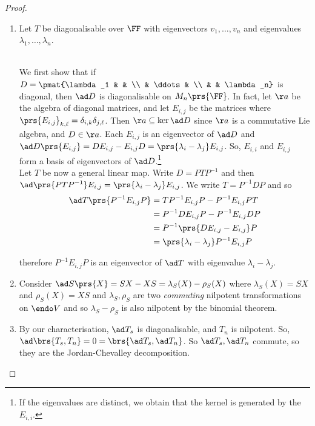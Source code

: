 \documentclass[10pt,a4paper,twoside,openany,hidelinks]{book}
\begin{document}
\begin{proof}
\begin{enumerate}
\item
Let $T$ be diagonalisable over $\FF$ with eigenvectors $v_1, \ldots, v_n$ and eigenvalues $\lambda_1, \ldots, \lambda_n$.
\begin{comment}
To show that it is enough to establish that $\ad D$ is diagonalisable for $D$ diagonal, write $P T P^{-1} = D$ for some $P$.
If $\ad D$ is diagonalisable, so is $\ad \prs{PTP^{-1}}$. But, $\ad\prs{PTP^{-1}}$ is conjugate to $\ad T$ and in fact, $\ad\prs{PTP^{-1}} = J_P\ad\prs{T}J_P^{-1}$ \emph{where we view $P$ as a linear transformation from $\endo V$ to $\endo V$} via $A \mapsto PAP^{-1} \eqqcolon J_P$.
\end{comment}
\\
We first show that if $D = \pmat{\lambda_1 & & \\ & \ddots & \\ & & \lambda_n}$ is diagonal, then $\ad D$ is diagonalisable on $M_n\prs{\FF}$.
In fact, let $\aa$ be the algebra of diagonal matrices, and let $E_{i,j}$ be the matrices where $\prs{E_{i,j}}_{k,\ell} = \delta_{i,k}\delta_{j,\ell}$.
Then $\aa \subseteq \ker \ad D$ since $\aa$ is a commutative Lie algebra, and $D \in \aa$. Each $E_{i,j}$ is an eigenvector of $\ad D$ and $\ad D\prs{E_{i,j}} = DE_{i,j} - E_{i,j}D =  \prs{\lambda_i - \lambda_j}E_{i,j}$.
So, $E_{i,i}$ and $E_{i,j}$ form a basis of eigenvectors of $\ad D$.\footnote{If the eigenvalues are distinct, we obtain that the kernel is generated by the $E_{i,i}$.}\\
Let $T$ be now a general linear map.
Write $D = PTP^{-1}$ and then $\ad \prs{PTP^{-1}} E_{i,j} = \prs{\lambda_i - \lambda_j}E_{i,j}$. We write $T = P^{-1}DP$ and so 
\begin{align*}
\ad T \prs{P^{-1}E_{i,j}P} &= T P^{-1}E_{i,j}P - P^{-1}E_{i,j}PT \\&= P^{-1}DE_{i,j} P - P^{-1} E_{i,j} D P \\&= P^{-1} \prs{DE_{i,j} - E_{i,j}}P \\&= \prs{\lambda_i - \lambda_j} P^{-1} E_{i,j}P
\end{align*}

therefore $P^{-1} E_{i,j} P$ is an eigenvector of $\ad T$ with eigenvalue $\lambda_i - \lambda_j$.
\item Consider $\ad S \prs{X} = SX - XS = \lambda_S(X) - \rho_S(X)$ where $\lambda_S(X) = SX$ and $\rho_S(X) = XS$ and $\lambda_S,\rho_S$ are two \emph{commuting} nilpotent transformations on $\endo V$ and so $\lambda_S - \rho_S$ is also nilpotent by the binomial theorem.\\
\item
By our characterisation, $\ad T_s$ is diagonalisable, and $T_n$ is nilpotent. So, $\ad \brs{T_s, T_n} = 0 = \brs{\ad T_s, \ad T_n}$. So $\ad T_s, \ad T_n$ commute, so they are the Jordan-Chevalley decomposition.
\end{enumerate}
\end{proof}
\end{document}
